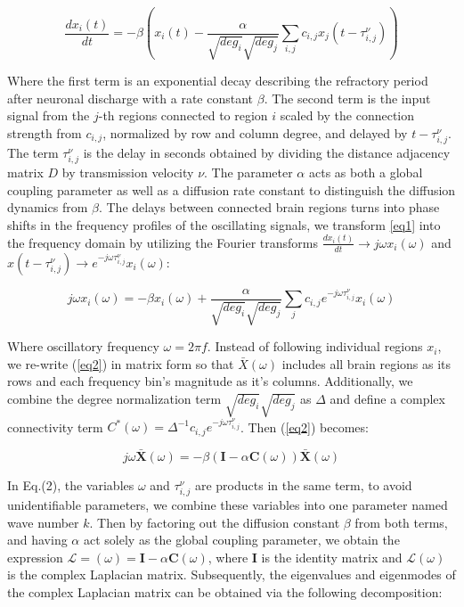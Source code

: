 \documentclass{article}
\begin{document}
\begin{equation} \label{eq1}
\frac{dx_{i}(t)}{dt} = -\beta (x_{i}(t) - \frac{\alpha}{\sqrt{deg_i}\sqrt{deg_j}} \sum_{i,j} c_{i,j} x_{j}(t-\tau^{\nu}_{i,j}))
\end{equation} 

Where the first term is an exponential decay describing the refractory period after neuronal discharge with a rate constant $\beta$. The second term is the input signal from the $j$-th regions connected to region $i$ scaled by the connection strength from $c_{i,j}$, normalized by row and column degree, and delayed by $t-\tau^{\nu}_{i,j}$. The term $\tau^{\nu}_{i,j}$ is the delay in seconds obtained by dividing the distance adjacency matrix $D$ by transmission velocity $\nu$. The parameter $\alpha$ acts as both a global coupling parameter as well as a diffusion rate constant to distinguish the diffusion dynamics from $\beta$. The delays between connected brain regions turns into phase shifts in the frequency profiles of the oscillating signals, we transform \ref{eq1} into the frequency domain by utilizing the Fourier transforms $\frac{dx_{i}(t)}{dt} \to j\omega x_{i}(\omega)$ and $x(t-\tau^{\nu}_{i,j}) \to e^{-j\omega \tau^{\nu}_{i,j}} x_{i}(\omega)$:

\begin{equation}
\label{eq2}
j\omega x_{i}(\omega) = -\beta x_{i}(\omega) + \frac{\alpha}{\sqrt{deg_i}\sqrt{deg_j}} \sum_j c_{i,j} e^{-j\omega \tau^{\nu}_{i,j}} x_{i}(\omega)
\end{equation}

Where oscillatory frequency $\omega = 2 \pi f$. Instead of following individual regions $x_{i}$, we re-write (\ref{eq2}) in matrix form so that $\bar{X}(\omega)$ includes all brain regions as its rows and each frequency bin's magnitude as it's columns. Additionally, we combine the degree normalization term $\sqrt{deg_i}\sqrt{deg_j}$ as $\Delta$ and define a complex connectivity term $C^{*}(\omega) = \Delta^{-1} c_{i,j}e^{-j\omega \tau^{\nu}_{i,j}}$. Then (\ref{eq2}) becomes:

\begin{equation}
\label{eq3}
j\omega \pmb{\bar{X}}(\omega) = -\beta (\pmb{I} - \alpha \pmb{C}(\omega)) \pmb{\bar{X}}(\omega)
\end{equation}

In Eq.(2), the variables $\omega$ and $\tau_{i,j}^{\nu}$ are products in the same term, to avoid unidentifiable parameters, we combine these variables into one parameter named wave number $k$. Then by factoring out the diffusion constant $\beta$ from both terms, and having $\alpha$ act solely as the global coupling parameter, we obtain the expression $\mathcal{L} = (\omega) = \pmb{I} - \alpha \pmb{C}(\omega)$, where $\pmb{I}$ is the identity matrix and $\mathcal{L}(\omega)$ is the complex Laplacian matrix. Subsequently, the eigenvalues and eigenmodes of the complex Laplacian matrix can be obtained via the following decomposition:
\end{document}
